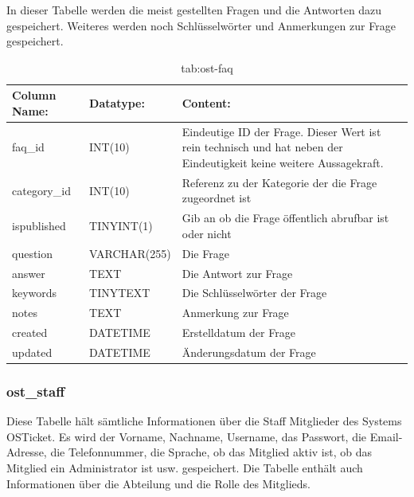 In dieser Tabelle werden die meist gestellten Fragen und die Antworten dazu gespeichert. Weiteres werden noch Schlüsselwörter und Anmerkungen zur Frage gespeichert.

\begin{table}[h]
	\begin{tabular}{|p{3.5cm}|p{4cm}|p{6.2cm}|}
		\hline
		\textbf{Column Name:} & \textbf{Datatype:} & \textbf{Content:}\\
		\hline
		faq\_id & INT(10) & Eindeutige ID der Frage. Dieser Wert ist rein technisch und hat  neben der Eindeutigkeit keine weitere 
		Aussagekraft.\\
		\hline
		category\_id & INT(10) & Referenz zu der Kategorie der die Frage zugeordnet ist  \\
		\hline
		ispublished & TINYINT(1) & Gib an ob die Frage öffentlich abrufbar ist oder nicht\\
		\hline
		question & VARCHAR(255) & Die Frage\\
		\hline
		answer & TEXT & Die Antwort zur Frage\\
		\hline
		keywords & TINYTEXT & Die Schlüsselwörter der Frage \\
		\hline
		notes & TEXT & Anmerkung zur Frage\\
		\hline
		created & DATETIME & Erstelldatum der Frage\\
		\hline
		updated & DATETIME & Änderungsdatum der Frage\\
		\hline
	\end{tabular}
	\caption{tab:ost-faq}
\end{table}
\label{tab:ost_faq}

\newpage

\subsubsection{ost\_staff}

Diese Tabelle hält sämtliche Informationen über die Staff Mitglieder des Systems OSTicket. Es wird der Vorname, Nachname, Username, das Passwort, die Email-Adresse, die Telefonnummer, die Sprache, ob das Mitglied aktiv ist, ob das Mitglied ein Administrator ist usw. gespeichert.
Die Tabelle enthält auch Informationen über die Abteilung und die Rolle des Mitglieds.


